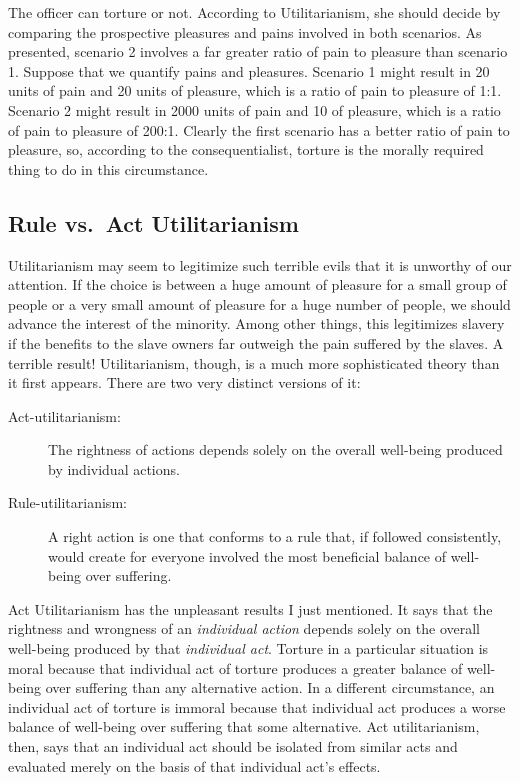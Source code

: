 \documentclass[9pt]{article}
\begin{document}
The officer can torture or not. According to Utilitarianism, she should
decide by comparing the prospective pleasures and pains involved in both
scenarios. As presented, scenario 2 involves a far greater ratio of pain
to pleasure than scenario 1. Suppose that we quantify pains and
pleasures. Scenario 1 might result in 20 units of pain and 20 units of
pleasure, which is a ratio of pain to pleasure of 1:1. Scenario 2 might
result in 2000 units of pain and 10 of pleasure, which is a ratio of
pain to pleasure of 200:1. Clearly the first scenario has a better ratio
of pain to pleasure, so, according to the consequentialist, torture is
the morally required thing to do in this circumstance.

\subsection{Rule vs.~Act
Utilitarianism}\label{rule-vs.act-utilitarianism}

Utilitarianism may seem to legitimize such terrible evils that it is
unworthy of our attention. If the choice is between a huge amount of
pleasure for a small group of people or a very small amount of pleasure
for a huge number of people, we should advance the interest of the
minority. Among other things, this legitimizes slavery if the benefits
to the slave owners far outweigh the pain suffered by the slaves. A
terrible result! Utilitarianism, though, is a much more sophisticated
theory than it first appears. There are two very distinct versions of
it:

\begin{description}
\item[Act-utilitarianism:] The rightness of actions depends solely on the
overall well-being produced by individual actions.

\item[Rule-utilitarianism:] A right action is one that conforms to a rule
that, if followed consistently, would create for everyone involved the
most beneficial balance of well-being over suffering.
\end{description}

Act Utilitarianism has the unpleasant results I just mentioned. It says
that the rightness and wrongness of an \emph{individual action} depends
solely on the overall well-being produced by that \emph{individual act}.
Torture in a particular situation is moral because that individual act
of torture produces a greater balance of well-being over suffering than
any alternative action. In a different circumstance, an individual act
of torture is immoral because that individual act produces a worse
balance of well-being over suffering that some alternative. Act
utilitarianism, then, says that an individual act should be isolated
from similar acts and evaluated merely on the basis of that individual
act's effects.
\end{document}
